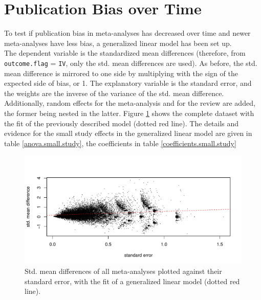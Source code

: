 \documentclass[11pt,a4paper,twoside]{book}\usepackage[]{graphicx}\usepackage[]{color}
\newenvironment{knitrout}{}{} %
\begin{document}
\section{Publication Bias over Time}
To test if publication bias in meta-analyses has decreased over time and newer meta-analyses have less bias, a generalized linear model has been set up. \\
The dependent variable is the standardized mean differences (therefore, from \texttt{outcome.flag} = \texttt{IV}, only the std. mean differences are used). As before, the std. mean difference is mirrored to one side by multiplying with the sign of the expected side of bias,  or 1. The explanatory variable is the standard error, and the weights are the inverse of the variance of the std. mean difference. Additionally, random effects for the meta-analysis and for the review are added, the former being nested in the latter. Figure \ref{fig:smds} shows the complete dataset with the fit of the previously described model (dotted red line). The details and evidence for the small study effects in the generalized linear model are given in table \ref{anova.small.study}, the coefficients in table \ref{coefficients.small.study}

\begin{figure}
\begin{knitrout}
\color{fgcolor}

{\centering \includegraphics[width=\textwidth-3cm]{figure/ch03_figunnamed-chunk-29-1} 

}



\end{knitrout}
\caption{Std. mean differences of all meta-analyses plotted against their standard error, with the fit of a generalized linear model (dotted red line).}
\label{fig:smds}
\end{figure}
\end{document}
